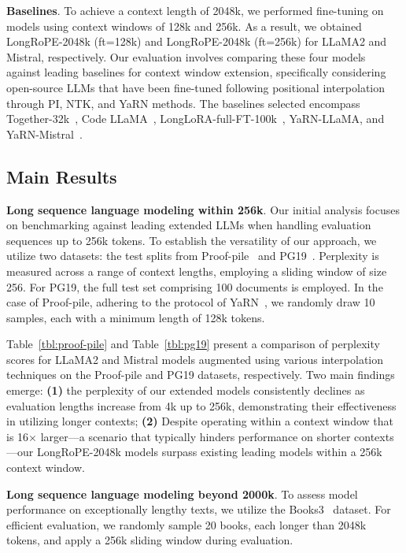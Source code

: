 \textbf{Baselines}. To achieve a context length of 2048k, we performed fine-tuning on models using context windows of 128k and 256k. As a result, we obtained LongRoPE-2048k (ft=128k) and LongRoPE-2048k (ft=256k) for LLaMA2 and Mistral, respectively. Our evaluation involves comparing these four models against leading baselines for context window extension, specifically considering open-source LLMs that have been fine-tuned following positional interpolation through PI, NTK, and YaRN methods. The baselines selected encompass Together-32k~\cite{together}, Code LLaMA~\cite{codellama}, LongLoRA-full-FT-100k~\cite{longlora}, YaRN-LLaMA, and YaRN-Mistral~\cite{yarn}.

\subsection{Main Results}

\label{sec:mainresult}
\textbf{Long sequence language modeling within 256k}. Our initial analysis focuses on benchmarking against leading extended LLMs when handling evaluation sequences up to 256k tokens. To establish the versatility of our approach, we utilize two datasets: the test splits from Proof-pile~\cite{pg19} and PG19~\cite{pile}. Perplexity is measured across a range of context lengths, employing a sliding window of size 256. For PG19, the full test set comprising 100 documents is employed. In the case of Proof-pile, adhering to the protocol of YaRN~\cite{yarn}, we randomly draw 10 samples, each with a minimum length of 128k tokens.

Table~\ref{tbl:proof-pile} and Table~\ref{tbl:pg19} present a comparison of perplexity scores for LLaMA2 and Mistral models augmented using various interpolation techniques on the Proof-pile and PG19 datasets, respectively. Two main findings emerge: \textbf{(1)} the perplexity of our extended models consistently declines as evaluation lengths increase from 4k up to 256k, demonstrating their effectiveness in utilizing longer contexts; \textbf{(2)} Despite operating within a context window that is 16$\times$ larger—a scenario that typically hinders performance on shorter contexts—our LongRoPE-2048k models surpass existing leading models within a 256k context window.

\textbf{Long sequence language modeling beyond 2000k}. To assess model performance on exceptionally lengthy texts, we utilize the Books3~\cite{pile} dataset. For efficient evaluation, we randomly sample 20 books, each longer than 2048k tokens, and apply a 256k sliding window during evaluation.

